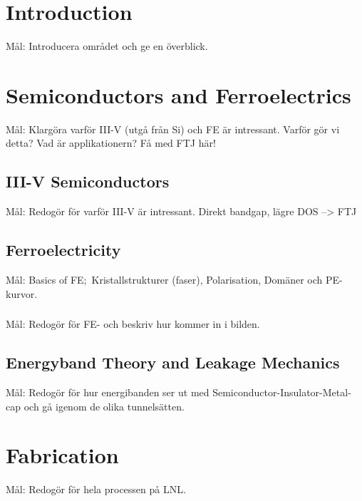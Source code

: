 \documentclass[11pt]{article}
\begin{document}
    \section{Introduction}
    
    Mål: Introducera området och ge en överblick.\cite{atle2019development}

    \section{Semiconductors and Ferroelectrics}

    Mål: Klargöra varför III-V (utgå från Si) och FE är intressant. Varför gör vi detta? Vad är applikationern? Få med FTJ här!

        \subsection{III-V Semiconductors}

        Mål: Redogör för varför III-V är intressant. Direkt bandgap, lägre DOS --> FTJ

        \subsection{Ferroelectricity}

        Mål: Basics of FE;\ Kristallstrukturer (faser), Polarisation, Domäner och PE-kurvor.

            \subsubsection{}

            Mål: Redogör för FE- och beskriv hur  kommer in i bilden.

        \subsection{Energyband Theory and Leakage Mechanics}

        Mål: Redogör för hur energibanden ser ut med Semiconductor-Insulator-Metal-cap och gå igenom de olika tunnelsätten.

    \section{Fabrication}

    Mål: Redogör för hela processen på LNL.\ 
\end{document}
